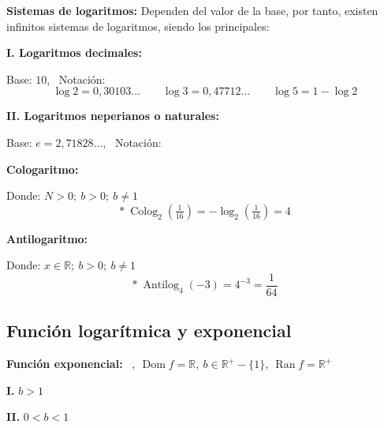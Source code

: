 \documentclass[11pt,a4paper]{article}
\newcommand{\ejes}[4]{%
  \draw[->] (#1,0) -- (#2,0) node[below] {$x$};
  \draw[->] (0,#3) -- (0,#4) node[left] {$y$};}
\begin{document}
\textbf{Sistemas de logaritmos:} Dependen del valor de la base, por tanto, existen infinitos
sistemas de logaritmos, siendo los principales:

\textbf{I. Logaritmos decimales:}

Base: $10$, \ Notación: \ 
\[\log 2 = 0{,}30103\ldots \qquad \log 3 = 0{,}47712\ldots \qquad \log 5 = 1 - \log 2\]

\textbf{II. Logaritmos neperianos o naturales:}

Base: $e = 2{,}71828\ldots$, \ Notación: \ 


\textcolor{naranja}{\textbf{Cologaritmo:}} \quad
{}

\quad Donde: $N > 0;\ b > 0;\ b \neq 1$
\[\ast\ \operatorname{Colog}_2\left(\tfrac{1}{16}\right) = -\log_2\left(\tfrac{1}{16}\right) = 4\]

\textcolor{naranja}{\textbf{Antilogaritmo:}} \quad {}

\quad Donde: $x \in \mathbb{R};\ b > 0;\ b \neq 1$
\[\ast\ \operatorname{Antilog}_4(-3) = 4^{-3} = \frac{1}{64}\]

\subsection*{Función logarítmica y exponencial}

\textbf{Función exponencial:} \ $,\ \operatorname{Dom}f = \mathbb{R},\
b \in \mathbb{R}^+ - \{1\},\ \operatorname{Ran}f = \mathbb{R}^+$

\begin{minipage}[t]{0.485\textwidth}
\textbf{I.} $b > 1$
\begin{center}

\end{center}
\end{minipage}\hfill
\begin{minipage}[t]{0.485\textwidth}
\textbf{II.} $0 < b < 1$
\begin{center}

\end{center}
\end{minipage}
\end{document}
